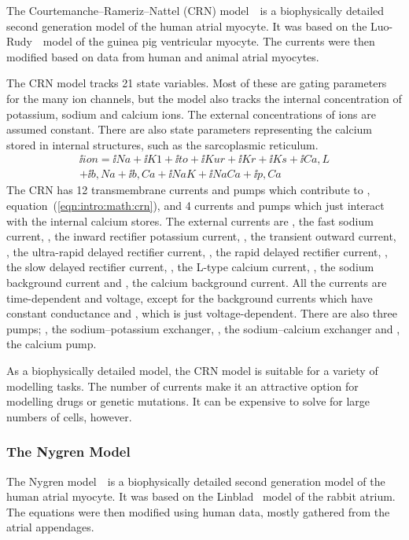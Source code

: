 The Courtemanche--Rameriz--Nattel (CRN) model~\cite{CRN98}\ is a biophysically
detailed second generation model of the human atrial myocyte.
It was based on the Luo-Rudy~\cite{Luo1994}\ model of the guinea pig ventricular
myocyte.
The currents were then modified based on data from human and animal atrial
myocytes.

The CRN model tracks 21 state variables.
Most of these are gating parameters for the many ion channels, but the model
also tracks the internal concentration of potassium, sodium and calcium ions.
The external concentrations of ions are assumed constant.
There are also state parameters representing the calcium stored in internal
structures, such as the sarcoplasmic reticulum.
\begin{align}
\label{eqn:intro:math:crn}
\ii{ion} = \ii{Na} + \ii{K1} + \ii{to} + \ii{Kur} + \ii{Kr} + \ii{Ks} + 
\ii{Ca,L} \nonumber \\
+ \ii{b,Na} + \ii{b,Ca} + \ii{NaK} + \ii{NaCa} + \ii{p,Ca}
\end{align}
The CRN has 12 transmembrane currents and pumps which contribute to ,
equation~(\ref{eqn:intro:math:crn}), and 4 currents and
pumps which just interact with the internal calcium stores.
The external currents are , the fast sodium current, , the inward
rectifier potassium current, , the transient outward current, , the
ultra-rapid delayed rectifier current, , the rapid delayed rectifier
current, , the slow delayed rectifier current, , the L-type
calcium current, , the sodium background current and , the
calcium background current.
All the currents are time-dependent and voltage, except for the background currents which
have constant conductance and , which is just voltage-dependent.
There are also three pumps; , the sodium--potassium exchanger,
, the sodium--calcium exchanger and , the calcium pump.

As a biophysically detailed model, the CRN model is suitable for a variety of
modelling tasks.
The number of currents make it an attractive option for modelling drugs or
genetic mutations.
It can be expensive to solve for large numbers of cells, however.

\subsubsection{The Nygren Model}

The Nygren model~\cite{Nygren1998}\ is a biophysically detailed second
generation model of the human atrial myocyte.
It was based on the Linblad~\cite{Lindblad1996} model of the rabbit atrium.
The equations were then modified using human data, mostly gathered from the
atrial appendages.

